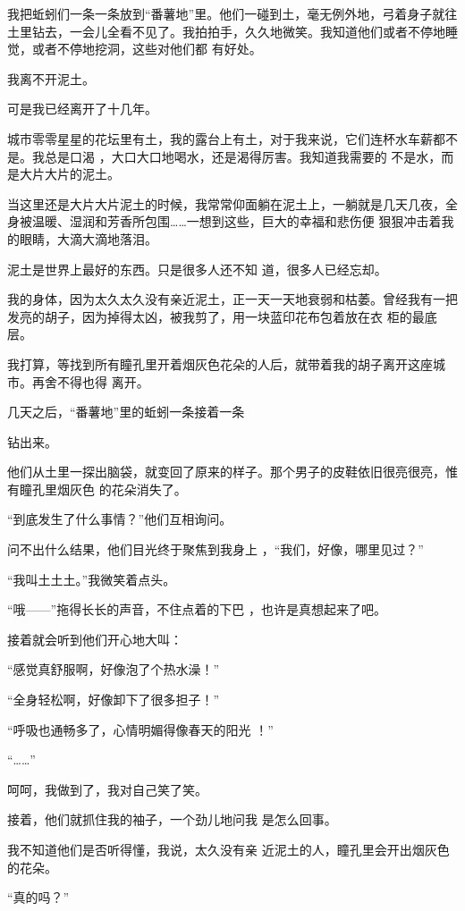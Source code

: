 \documentclass{article}
\begin{document}
我把蚯蚓们一条一条放到“番薯地”里。他们一碰到土，毫无例外地，弓着身子就往土里钻去，一会儿全看不见了。我拍拍手，久久地微笑。我知道他们或者不停地睡觉，或者不停地挖洞，这些对他们都
有好处。 


我离不开泥土。 


可是我已经离开了十几年。 

城市零零星星的花坛里有土，我的露台上有土，对于我来说，它们连杯水车薪都不是。我总是口渴
\newpage
，大口大口地喝水，还是渴得厉害。我知道我需要的
不是水，而是大片大片的泥土。 

当这里还是大片大片泥土的时候，我常常仰面躺在泥土上，一躺就是几天几夜，全身被温暖、湿润和芳香所包围……一想到这些，巨大的幸福和悲伤便
狠狠冲击着我的眼睛，大滴大滴地落泪。 

泥土是世界上最好的东西。只是很多人还不知
道，很多人已经忘却。 

我的身体，因为太久太久没有亲近泥土，正一天一天地衰弱和枯萎。曾经我有一把发亮的胡子，因为掉得太凶，被我剪了，用一块蓝印花布包着放在衣
柜的最底层。 

我打算，等找到所有瞳孔里开着烟灰色花朵的人后，就带着我的胡子离开这座城市。再舍不得也得
离开。 

几天之后，“番薯地”里的蚯蚓一条接着一条
\newpage

钻出来。 

他们从土里一探出脑袋，就变回了原来的样子。那个男子的皮鞋依旧很亮很亮，惟有瞳孔里烟灰色
的花朵消失了。 


“到底发生了什么事情？”他们互相询问。 

问不出什么结果，他们目光终于聚焦到我身上
，“我们，好像，哪里见过？” 


“我叫土土土。”我微笑着点头。 

“哦——”拖得长长的声音，不住点着的下巴
，也许是真想起来了吧。 


接着就会听到他们开心地大叫： 


“感觉真舒服啊，好像泡了个热水澡！” 


\newpage

“全身轻松啊，好像卸下了很多担子！” 

“呼吸也通畅多了，心情明媚得像春天的阳光
！” 


“……” 


呵呵，我做到了，我对自己笑了笑。 

接着，他们就抓住我的袖子，一个劲儿地问我
是怎么回事。 

我不知道他们是否听得懂，我说，太久没有亲
近泥土的人，瞳孔里会开出烟灰色的花朵。 


“真的吗？” 
\end{document}

